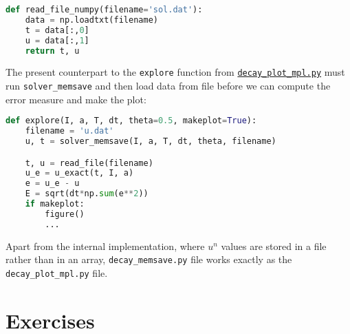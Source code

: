 \documentclass[graybox,sectrefs,envcountresetchap,open=right,final]{svmonodo}
\begin{document}
\begin{lstlisting}[language=python,style=blue1_bluegreen]
def read_file_numpy(filename='sol.dat'):
    data = np.loadtxt(filename)
    t = data[:,0]
    u = data[:,1]
    return t, u

\end{lstlisting}


The present counterpart to the \texttt{explore} function from
\href{{http://tinyurl.com/ofkw6kc/alg/decay_plot_mpl.py}}{\nolinkurl{decay_plot_mpl.py}} must run
\Verb!solver_memsave! and then load data from file before we can compute
the error measure and make the plot:













\begin{lstlisting}[language=python,style=blue1_bluegreen]
def explore(I, a, T, dt, theta=0.5, makeplot=True):
    filename = 'u.dat'
    u, t = solver_memsave(I, a, T, dt, theta, filename)

    t, u = read_file(filename)
    u_e = u_exact(t, I, a)
    e = u_e - u
    E = sqrt(dt*np.sum(e**2))
    if makeplot:
        figure()
        ...

\end{lstlisting}


Apart from the internal implementation, where $u^n$ values are stored
in a file rather than in an array, \Verb!decay_memsave.py! file works
exactly as the \Verb!decay_plot_mpl.py! file.

\section{Exercises}
\end{document}
